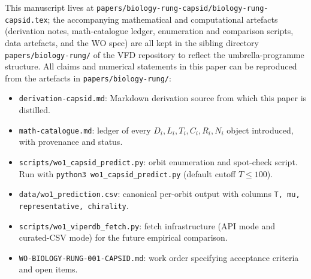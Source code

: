\documentclass[12pt]{article}
\begin{document}
This manuscript lives at
\texttt{papers/biology-rung-capsid/biology-rung-capsid.tex}; the
accompanying mathematical and computational artefacts (derivation
notes, math-catalogue ledger, enumeration and comparison scripts,
data artefacts, and the WO spec) are all kept in the sibling
directory \texttt{papers/biology-rung/} of the VFD repository to
reflect the umbrella-programme structure. All claims and numerical
statements in this paper can be reproduced from the artefacts in
\texttt{papers/biology-rung/}:
\begin{itemize}
\item \texttt{derivation-capsid.md}: Markdown derivation source from
which this paper is distilled.
\item \texttt{math-catalogue.md}: ledger of every $D_i, L_i, T_i,
C_i, R_i, N_i$ object introduced, with provenance and status.
\item \texttt{scripts/wo1\_capsid\_predict.py}: orbit enumeration
and spot-check script. Run with \texttt{python3 wo1\_capsid\_predict.py}
(default cutoff $T \le 100$).
\item \texttt{data/wo1\_prediction.csv}: canonical per-orbit output
with columns \texttt{T, mu, representative, chirality}.
\item \texttt{scripts/wo1\_viperdb\_fetch.py}: fetch infrastructure
(API mode and curated-CSV mode) for the future empirical comparison.
\item \texttt{WO-BIOLOGY-RUNG-001-CAPSID.md}: work order specifying
acceptance criteria and open items.
\end{itemize}
\end{document}
